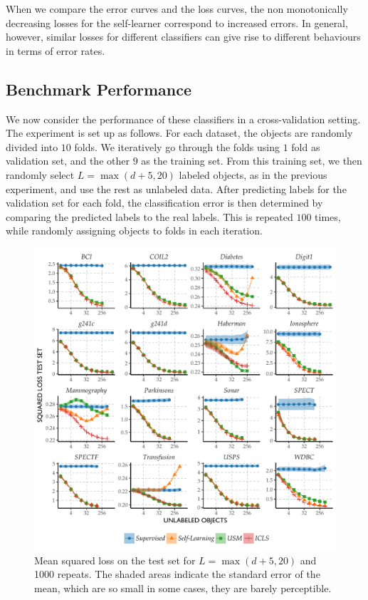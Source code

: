 \documentclass[twoside]{memoir}\usepackage[]{graphicx}\usepackage{xcolor}
\makeatletter
\def\maxwidth{ %
  \ifdim\Gin@nat@width>\linewidth
    \linewidth
  \else
    \Gin@nat@width
  \fi
}
\newenvironment{knitrout}{}{} %
\newcommand{\featdim}{d}
\newcommand{\Nlab}{L}
\makeatother
\begin{document}
When we compare the error curves and the loss curves, the non monotonically decreasing losses for the self-learner correspond to increased errors. In general, however, similar losses for different classifiers can give rise to different behaviours in terms of error rates.

\subsection{Benchmark Performance} \label{subsection:crossvalidation}
We now consider the performance of these classifiers in a cross-validation setting. The experiment is set up as follows. For each dataset, the objects are randomly divided into $10$ folds. We iteratively go through the folds using $1$ fold as validation set, and the other $9$ as the training set. From this training set, we then randomly select $\Nlab=\max(\featdim+5,20)$ labeled objects, as in the previous experiment, and use the rest as unlabeled data. After predicting labels for the validation set for each fold, the classification error is then determined by comparing the predicted labels to the real labels. This is repeated $100$ times, while randomly assigning objects to folds in each iteration.

\begin{knitrout}
\color{fgcolor}\begin{figure}
\includegraphics[width=\maxwidth]{figure/losscurves-1} \caption[Mean squared loss on the test set for $\Nlab=\max(\featdim+5,20)$ and 1000 repeats]{Mean squared loss on the test set for $\Nlab=\max(\featdim+5,20)$ and 1000 repeats. The shaded areas indicate the standard error of the mean, which are so small in some cases, they are barely perceptible.}\label{fig:losscurves}
\end{figure}


\end{knitrout}
\end{document}
